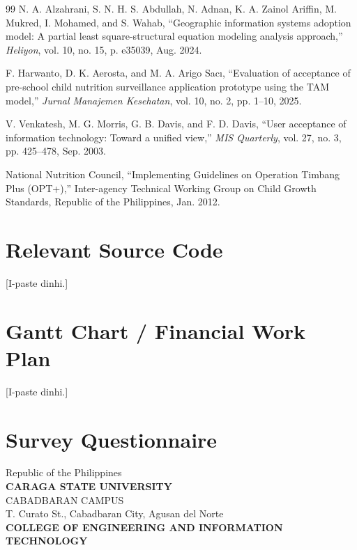 \documentclass[12pt, a4paper]{report}
\begin{document}
\begin{thebibliography}{99}
N. A. Alzahrani, S. N. H. S. Abdullah, N. Adnan, K. A. Zainol Ariffin, M. Mukred, I. Mohamed, and S. Wahab, ``Geographic information systems adoption model: A partial least square-structural equation modeling analysis approach,'' \textit{Heliyon}, vol. 10, no. 15, p. e35039, Aug. 2024.

F. Harwanto, D. K. Aerosta, and M. A. Arigo Sacı, ``Evaluation of acceptance of pre-school child nutrition surveillance application prototype using the TAM model,'' \textit{Jurnal Manajemen Kesehatan}, vol. 10, no. 2, pp. 1--10, 2025.

V. Venkatesh, M. G. Morris, G. B. Davis, and F. D. Davis, ``User acceptance of information technology: Toward a unified view,'' \textit{MIS Quarterly}, vol. 27, no. 3, pp. 425--478, Sep. 2003.

National Nutrition Council, ``Implementing Guidelines on Operation Timbang Plus (OPT+),'' Inter-agency Technical Working Group on Child Growth Standards, Republic of the Philippines, Jan. 2012.

\end{thebibliography}
\clearpage

\appendix

\chapter{Relevant Source Code}
\label{app:source_code}
[I-paste dinhi.]

\chapter{Gantt Chart / Financial Work Plan}
\label{app:gantt}
[I-paste dinhi.]

\chapter{Survey Questionnaire}
\label{app:questionnaire}


\begin{center}
    \small Republic of the Philippines \\
    \textbf{CARAGA STATE UNIVERSITY} \\
    CABADBARAN CAMPUS \\
    T. Curato St., Cabadbaran City, Agusan del Norte \\
    \textbf{COLLEGE OF ENGINEERING AND INFORMATION TECHNOLOGY}
\end{center}
\end{document}
